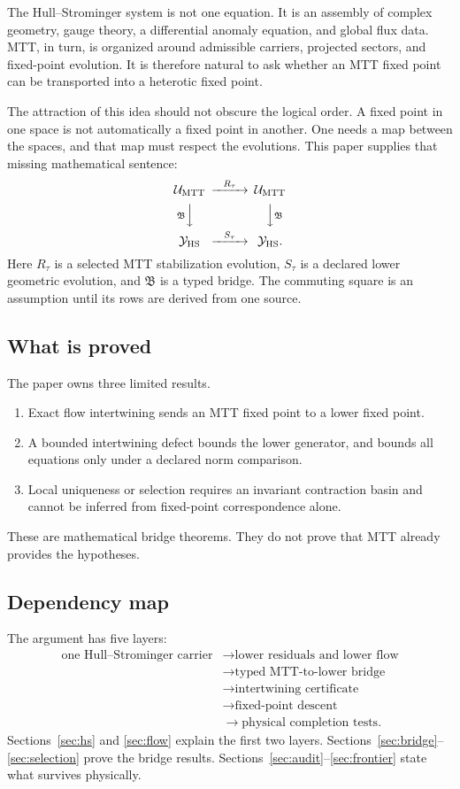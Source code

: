 \documentclass[11pt]{article}
\theoremstyle{definition}
\theoremstyle{remark}
\newcommand{\cU}{\mathcal U}
\newcommand{\cY}{\mathcal Y}
\newcommand{\HS}{Hull--Strominger}
\begin{document}
The \HS{} system is not one equation.  It is an assembly of complex geometry,
gauge theory, a differential anomaly equation, and global flux data.  MTT, in
turn, is organized around admissible carriers, projected sectors, and
fixed-point evolution.  It is therefore natural to ask whether an MTT fixed
point can be transported into a heterotic fixed point.

The attraction of this idea should not obscure the logical order.  A fixed
point in one space is not automatically a fixed point in another.  One needs
a map between the spaces, and that map must respect the evolutions.  This
paper supplies that missing mathematical sentence:
\[
\begin{CD}
\cU_{\mathrm{MTT}} @>{R_\tau}>> \cU_{\mathrm{MTT}}\\
@V{\mathfrak B}VV @VV{\mathfrak B}V\\
\cY_{\mathrm{HS}} @>{S_\tau}>> \cY_{\mathrm{HS}} .
\end{CD}
\]
Here \(R_\tau\) is a selected MTT stabilization evolution,
\(S_\tau\) is a declared lower geometric evolution, and
\(\mathfrak B\) is a typed bridge.  The commuting square is an assumption
until its rows are derived from one source.

\subsection{What is proved}

The paper owns three limited results.
\begin{enumerate}[leftmargin=1.7em]
\item Exact flow intertwining sends an MTT fixed point to a lower fixed point.
\item A bounded intertwining defect bounds the lower generator, and bounds
      all equations only under a declared norm comparison.
\item Local uniqueness or selection requires an invariant contraction basin
      and cannot be inferred from fixed-point correspondence alone.
\end{enumerate}
These are mathematical bridge theorems.  They do not prove that MTT already
provides the hypotheses.

\subsection{Dependency map}

The argument has five layers:
\[
\begin{split}
\text{one Hull--Strominger carrier}
&\longrightarrow \text{lower residuals and lower flow}\\
&\longrightarrow \text{typed MTT-to-lower bridge}\\
&\longrightarrow \text{intertwining certificate}\\
&\longrightarrow \text{fixed-point descent}\\
&\longrightarrow \text{physical completion tests}.
\end{split}
\]
Sections~\ref{sec:hs} and \ref{sec:flow} explain the first two layers.
Sections~\ref{sec:bridge}--\ref{sec:selection} prove the bridge results.
Sections~\ref{sec:audit}--\ref{sec:frontier} state what survives physically.
\end{document}
